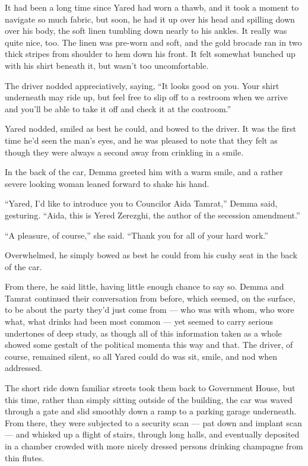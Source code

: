 It had been a long time since Yared had worn a thawb, and it took a moment to navigate so much fabric, but soon, he had it up over his head and spilling down over his body, the soft linen tumbling down nearly to his ankles. It really was quite nice, too. The linen was pre-worn and soft, and the gold brocade ran in two thick stripes from shoulder to hem down his front. It felt somewhat bunched up with his shirt beneath it, but wasn't too uncomfortable.

The driver nodded appreciatively, saying, ``It looks good on you. Your shirt underneath may ride up, but feel free to slip off to a restroom when we arrive and you'll be able to take it off and check it at the coatroom.''

Yared nodded, smiled as best he could, and bowed to the driver. It was the first time he'd seen the man's eyes, and he was pleased to note that they felt as though they were always a second away from crinkling in a smile.

In the back of the car, Demma greeted him with a warm smile, and a rather severe looking woman leaned forward to shake his hand.

``Yared, I'd like to introduce you to Councilor Aida Tamrat,'' Demma said, gesturing. ``Aida, this is Yered Zerezghi, the author of the secession amendment.''

``A pleasure, of course,'' she said. ``Thank you for all of your hard work.''

Overwhelmed, he simply bowed as best he could from his cushy seat in the back of the car.

From there, he said little, having little enough chance to say so. Demma and Tamrat continued their conversation from before, which seemed, on the surface, to be about the party they'd just come from — who was with whom, who wore what, what drinks had been most common — yet seemed to carry serious undertones of deep study, as though all of this information taken as a whole showed some gestalt of the political momenta this way and that. The driver, of course, remained silent, so all Yared could do was sit, smile, and nod when addressed.

The short ride down familiar streets took them back to Government House, but this time, rather than simply sitting outside of the building, the car was waved through a gate and slid smoothly down a ramp to a parking garage underneath. From there, they were subjected to a security scan — pat down and implant scan — and whisked up a flight of stairs, through long halls, and eventually deposited in a chamber crowded with more nicely dressed persons drinking champagne from thin flutes.

